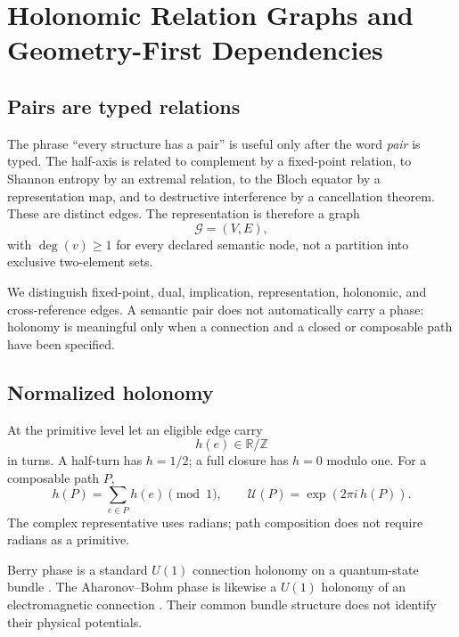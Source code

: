 \chapter{Holonomic Relation Graphs and Geometry-First Dependencies}
\label{chap:geometry-dependencies}

\section{Pairs are typed relations}
The phrase ``every structure has a pair'' is useful only after the word
\emph{pair} is typed. The half-axis is related to complement by a fixed-point
relation, to Shannon entropy by an extremal relation, to the Bloch equator by a
representation map, and to destructive interference by a cancellation theorem.
These are distinct edges. The representation is therefore a graph
\[
 \mathcal G=(V,E),
\]
with $\deg(v)\ge1$ for every declared semantic node, not a partition into
exclusive two-element sets.

We distinguish fixed-point, dual, implication, representation, holonomic, and
cross-reference edges. A semantic pair does not automatically carry a phase:
holonomy is meaningful only when a connection and a closed or composable path
have been specified.

\section{Normalized holonomy}
At the primitive level let an eligible edge carry
\[
 h(e)\in\mathbb R/\mathbb Z
\]
in turns. A half-turn has $h=1/2$; a full closure has $h=0$ modulo one. For a
composable path $P$,
\begin{equation}
 h(P)=\sum_{e\in P}h(e)\pmod1,
 \qquad
 \mathcal U(P)=\exp(2\pi i\,h(P)).
 \label{eq:path-holonomy-sum}
\end{equation}
The complex representative uses radians; path composition does not require
radians as a primitive.

Berry phase is a standard $U(1)$ connection holonomy on a quantum-state bundle
\citep{berry1984,simon1983}. The Aharonov--Bohm phase is likewise a $U(1)$
holonomy of an electromagnetic connection \citep{aharonovbohm1959}. Their
common bundle structure does not identify their physical potentials.

